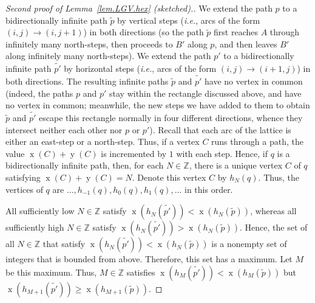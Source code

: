 \documentclass[reqno]{amsart}
\newcommand{\0}{\phantom{c}}
\DeclareMathOperator{\xcoord}{x} %
\DeclareMathOperator{\ycoord}{y} %
\newenvironment{verlong}{}{}
\theoremstyle{plain}
\theoremstyle{definition}
\numberwithin{equation}{section}
\begin{document}
\begin{verlong}
\begin{proof}[Second proof of Lemma~\ref{lem.LGV.hex} (sketched).]
We extend the path $p$ to a bidirectionally infinite path $\widetilde{p}$ by
vertical steps (\textit{i.e.}, arcs of the form $\left(  i,j\right)  \rightarrow\left(
i,j+1\right)  $) in both directions (so the path $\widetilde{p}$ first reaches
$A$ through infinitely many north-steps, then proceeds to $B'$ along
$p$, and then leaves $B'$ along infinitely many north-steps). We
extend the path $p'$ to a bidirectionally infinite path
$\widetilde{p'}$ by horizontal steps (\textit{i.e.}, arcs of the form $\left(
i,j\right)  \rightarrow\left(  i+1,j\right)  $) in both directions. The
resulting infinite paths $\widetilde{p}$ and $\widetilde{p'}$ have no
vertex in common (indeed, the paths $p$ and $p'$ stay within the
rectangle discussed above, and have no vertex in common; meanwhile, the new
steps we have added to them to obtain $\widetilde{p}$ and
$\widetilde{p'}$ escape this rectangle normally in four different
directions, whence they intersect neither each other nor $p$ or $p'$).
Recall that each arc of the lattice is either an east-step or a north-step.
Thus, if a vertex $C$ runs through a path, the value $\xcoord\left(
C\right)  +\ycoord\left(  C\right)  $ is incremented by $1$ with
each step. Hence, if $q$ is a bidirectionally infinite path, then, for each
$N\in\mathbb{Z}$, there is a unique vertex $C$ of $q$ satisfying
$\xcoord\left(  C\right)  +\ycoord\left(  C\right)  =N$.
Denote this vertex $C$ by $h_N\left(  q\right)  $. Thus, the vertices of $q$
are $\ldots,h_{-1}\left(  q\right)  ,h_{0}\left(  q\right)  ,h_1\left(
q\right)  ,\ldots$ in this order.

All sufficiently low $N\in\mathbb{Z}$ satisfy $\xcoord\left(
h_N\left(  \widetilde{p'}\right)  \right)  <\xcoord\left(
h_N\left(  \widetilde{p}\right)  \right)  $, whereas all sufficiently high
$N\in\mathbb{Z}$ satisfy $\xcoord\left(  h_N\left(
\widetilde{p'}\right)  \right)  >\xcoord\left(  h_N\left(
\widetilde{p}\right)  \right)  $. Hence, the set of all $N\in\mathbb{Z}$ that
satisfy $\xcoord\left(  h_N\left(  \widetilde{p'}\right)
\right)  <\xcoord\left(  h_N\left(  \widetilde{p}\right)  \right)$
is a nonempty set of integers that is bounded from above. Therefore, this
set has a maximum. Let $M$ be this maximum. Thus, $M\in\mathbb{Z}$ satisfies
$\xcoord\left(  h_{M}\left(  \widetilde{p'}\right)  \right)
<\xcoord\left(  h_{M}\left(  \widetilde{p}\right)  \right)  $ but
$\xcoord\left(  h_{M+1}\left(  \widetilde{p'}\right)
\right)  \geq\xcoord\left(  h_{M+1}\left(  \widetilde{p}\right)
\right)  $.


\end{proof}
\end{verlong}
\end{document}

